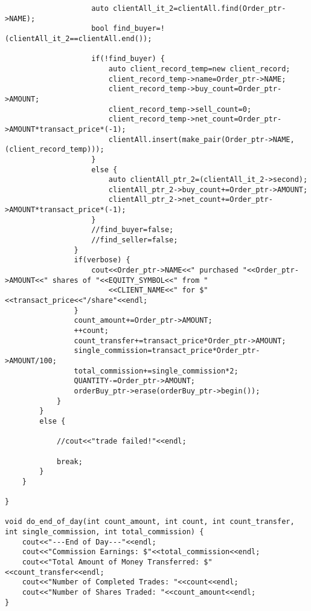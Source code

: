 \documentclass{article}
\begin{document}
\begin{spacing}{1.5}
\begin{lstlisting}
                    auto clientAll_it_2=clientAll.find(Order_ptr->NAME);
                    bool find_buyer=!(clientAll_it_2==clientAll.end());

                    if(!find_buyer) {
                        auto client_record_temp=new client_record;
                        client_record_temp->name=Order_ptr->NAME;
                        client_record_temp->buy_count=Order_ptr->AMOUNT;
                        client_record_temp->sell_count=0;
                        client_record_temp->net_count=Order_ptr->AMOUNT*transact_price*(-1);
                        clientAll.insert(make_pair(Order_ptr->NAME, (client_record_temp)));
                    }
                    else {
                        auto clientAll_ptr_2=(clientAll_it_2->second);
                        clientAll_ptr_2->buy_count+=Order_ptr->AMOUNT;
                        clientAll_ptr_2->net_count+=Order_ptr->AMOUNT*transact_price*(-1);
                    }
                    //find_buyer=false;
                    //find_seller=false;
                }
                if(verbose) {
                    cout<<Order_ptr->NAME<<" purchased "<<Order_ptr->AMOUNT<<" shares of "<<EQUITY_SYMBOL<<" from "
                        <<CLIENT_NAME<<" for $"<<transact_price<<"/share"<<endl;
                }
                count_amount+=Order_ptr->AMOUNT;
                ++count;
                count_transfer+=transact_price*Order_ptr->AMOUNT;
                single_commission=transact_price*Order_ptr->AMOUNT/100;
                total_commission+=single_commission*2;
                QUANTITY-=Order_ptr->AMOUNT;
                orderBuy_ptr->erase(orderBuy_ptr->begin());
            }
        }
        else {

            //cout<<"trade failed!"<<endl;

            break;
        }
    }

}

void do_end_of_day(int count_amount, int count, int count_transfer, int single_commission, int total_commission) {
    cout<<"---End of Day---"<<endl;
    cout<<"Commission Earnings: $"<<total_commission<<endl;
    cout<<"Total Amount of Money Transferred: $"<<count_transfer<<endl;
    cout<<"Number of Completed Trades: "<<count<<endl;
    cout<<"Number of Shares Traded: "<<count_amount<<endl;
}
\end{lstlisting}
\end{spacing}
\end{document}
